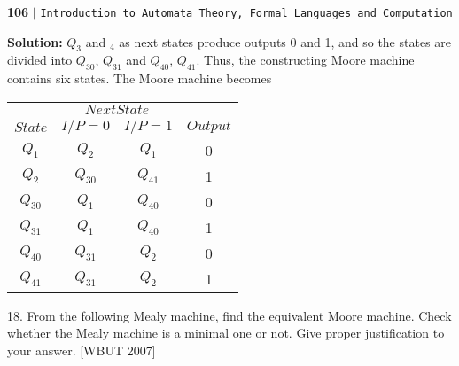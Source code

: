 \documentclass{article}
\begin{document}
\newpage

\begin{flushleft}
    \textbf{106}\hspace*{0.1cm} \textbf{$|$} \hspace*{0.1cm} \texttt{Introduction to Automata Theory, Formal Languages and Computation}
  \end{flushleft}
  \vspace*{0.5cm}

\textbf{Solution:} $Q_3$ and $_4$ as next states produce outputs 0 and 1, and so the states are divided into $Q_30$, $Q_31$
and $Q_40$, $Q_41$. Thus, the constructing Moore machine contains six states. The Moore machine becomes\\

\begin{center}
\begin{tabular}{cccc}
 \hline

 \hline

 \hline

 \hline
 & \multicolumn{2}{c}{$Next State$}\\
 \cline{2-3}
 $State$ &  $I/P=0$ & $I/P=1$  &  $Output$\\
\hline
$Q_1$  &$Q_2$  & $Q_1$  &  0\\
$Q_2$  &$Q_30$ & $Q_41$& 1\\
$Q_30$ &$Q_1$  & $Q_40$& 0\\
$Q_31$ &$Q_1$  & $Q_40$& 1\\
$Q_40$ &$Q_31$ & $Q_2$& 0\\
$Q_41$ &$Q_31$ & $Q_2$& 1\\
 \hline

 \hline

 \hline

 \hline
\end{tabular}
\end{center}

\vspace*{0.3cm}

18. From the following Mealy machine, find the equivalent Moore machine. Check whether the Mealy
machine is a minimal one or not. Give proper justification to your answer. \hspace*{7cm} [WBUT 2007]\\
\end{document}
